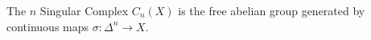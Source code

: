 The $n$ Singular Complex $C_n(X)$ is the free abelian group generated by continuous maps $\sigma: \Delta^n \to X$.